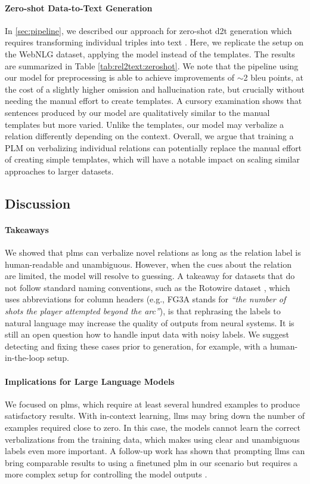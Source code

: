 \paragraph{Zero-shot Data-to-Text Generation} In \autoref{sec:pipeline}, we described our approach for zero-shot \ac{d2t} generation which requires transforming individual triples into text \cite{kasner2022neural}. Here, we replicate the setup on the WebNLG dataset, applying the \BARTr{} model instead of the templates. The results are summarized in Table \ref{tab:rel2text:zeroshot}.  We note that the pipeline using our model for preprocessing is able to achieve improvements of $\sim$2 \acs{bleu} points, at the cost of a slightly higher omission and hallucination rate, but crucially without needing the manual effort to create templates. A cursory examination shows that sentences produced by our model are qualitatively similar to the manual templates but more varied. Unlike the templates, our model may verbalize a relation differently depending on the context.
Overall, we argue that training a PLM on verbalizing individual relations can potentially replace the manual effort of creating simple templates, which will have a notable impact on scaling similar approaches to larger datasets.


\subsection{Discussion}

\paragraph{Takeaways} We showed that \acp{plm} can verbalize novel relations as long as the relation label is human-readable and unambiguous. However, when the cues about the relation are limited, the model will resolve to guessing. A takeaway for datasets that do not follow standard naming conventions, such as the Rotowire dataset \cite{wiseman2017challenges}, which uses abbreviations for column headers (e.g., FG3A stands for \textit{``the number of shots the player attempted beyond the arc''}), is that rephrasing the labels to natural language may increase the quality of outputs from neural systems. It is still an open question how to handle input data with noisy labels. We suggest detecting and fixing these cases prior to generation, for example, with a human-in-the-loop setup.


\paragraph{Implications for Large Language Models} We focused on \acp{plm}, which require at least several hundred examples to produce satisfactory results. With in-context learning, \acp{llm} may bring down the number of examples required close to zero. In this case, the models cannot learn the correct verbalizations from the training data, which makes using clear and unambiguous labels even more important. A follow-up work has shown that prompting \acp{llm} can bring comparable results to using a finetuned \ac{plm} in our scenario but requires a more complex setup for controlling the model outputs \cite{vejvarASPIROAnyshotStructured2023}.

